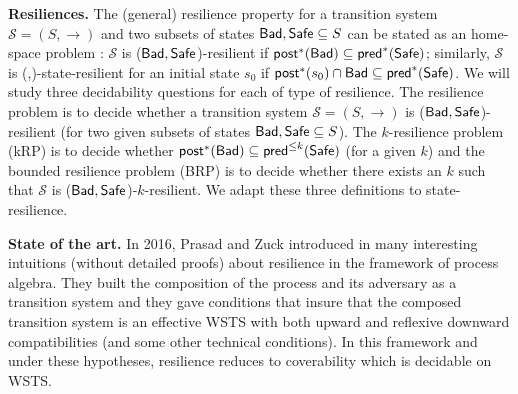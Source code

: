 {\bf Resiliences.}  
The (general) resilience property for a transition system $\mathscr{S} = (S,\rightarrow )$ and two subsets of states $\textsf{Bad},\textsf{Safe} \subseteq S$ can be stated as an home-space problem : $\mathscr{S}$ is ($\textsf{Bad},\textsf{Safe}$)-resilient if $\textsf{post}^*(\textsf{Bad}) \subseteq \textsf{pred}^*(\textsf{Safe})$; 
similarly, $\mathscr{S}$ is (\Bad,\Safe)-state-resilient for an initial state $s_0$ if $\textsf{post}^*(s_0) \cap \textsf{Bad} \subseteq \textsf{pred}^*(\textsf{Safe})$.
We will study three decidability questions for each of type of resilience.
The resilience problem is to decide whether a transition system $\mathscr{S} = (S,\rightarrow )$ is ($\textsf{Bad},\textsf{Safe}$)-resilient (for two given subsets of states $\textsf{Bad},\textsf{Safe} \subseteq S$).
The $k$-resilience problem (kRP) is to decide whether $\textsf{post}^*(\textsf{Bad}) \subseteq \textsf{pred}^{\leq k}(\textsf{Safe})$ (for a given $k$) and 
the bounded resilience problem (BRP) is to decide whether there exists an $k$ such that $\mathscr{S}$ is ($\textsf{Bad},\textsf{Safe}$)-$k$-resilient. We adapt these three definitions to state-resilience.


{\bf State of the art.}
In 2016, Prasad and Zuck introduced in  \cite{DBLP:journals/corr/PrasadZ16} many interesting intuitions (without detailed proofs) about resilience in the framework of process algebra. They built the composition of the process and its adversary as a transition system and they gave conditions that insure that the composed transition system is an effective WSTS with both upward and reflexive downward compatibilities (and some other technical conditions). In this framework and under these hypotheses, resilience reduces to coverability which is decidable on WSTS. 

